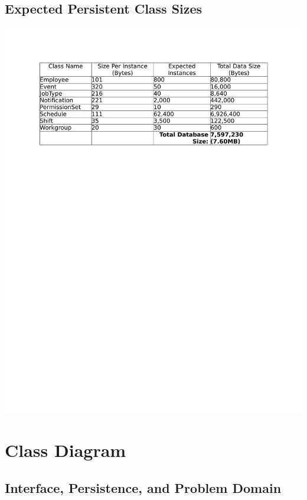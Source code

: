 \documentclass[letterpaper,12pt]{report}
\begin{document}
\pagebreak
\section{Expected Persistent Class Sizes}
\includegraphics[trim=20mm 10mm 25mm 20mm]{externals/ExpectedPersistentClassSizes.pdf}

\chapter{Class Diagram}
\section{Interface, Persistence, and Problem Domain}
\newpage
\end{document}
